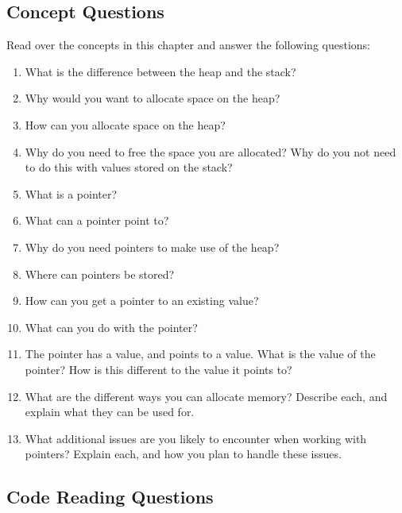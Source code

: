 \subsection{Concept Questions} %
\label{sub:dynamic_memory_concept_questions}

Read over the concepts in this chapter and answer the following questions:
\begin{enumerate}
  \item What is the difference between the heap and the stack?
  \item Why would you want to allocate space on the heap?
  \item How can you allocate space on the heap?
  \item Why do you need to free the space you are allocated? Why do you not need to do this with values stored on the stack?
  \item What is a pointer?
  \item What can a pointer point to?
  \item Why do you need pointers to make use of the heap?
  \item Where can pointers be stored?
  \item How can you get a pointer to an existing value?
  \item What can you do with the pointer?
  \item The pointer has a value, and points to a value. What is the value of the pointer? How is this different to the value it points to?
  \item What are the different ways you can allocate memory? Describe each, and explain what they can be used for.
  \item What additional issues are you likely to encounter when working with pointers? Explain each, and how you plan to handle these issues.
\end{enumerate}

\clearpage
\subsection{Code Reading Questions} %
\label{sub:dynamic_memory_code_reading_questions}

